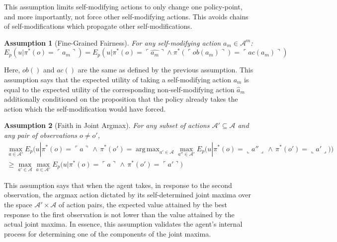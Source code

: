 \documentclass{article}
\newcommand{\qq}[1]{\ulcorner #1 \urcorner}
\newtheorem{assumption}{Assumption}
\DeclareMathOperator*{\argmax}{arg\,max}
\begin{document}
This assumption limits self-modifying actions to only change one policy-point, and more importantly, not force other self-modifying actions. This avoids chains of self-modifications which propagate other self-modifications. 

\begin{assumption}[Fine-Grained Fairness]
For any self-modifying action $a_m \in \mathcal{A}^m$:
$$ E_p(u|\pi^*(o)=\qq{a_m}) = E_p(u|\pi^*(o)=\qq{\hat {a_m}} \wedge \pi^*(\qq{ob(a_m)})=\qq{ac(a_m)}) $$
\end{assumption}

Here, $ob()$ and $ac()$ are the same as defined by the previous assumption. This assumption says that the expected utility of taking a self-modifying action $a_m$ is equal to the expected utility of the corresponding non-self-modifying action $\hat a_m$ additionally conditioned on the proposition that the policy already takes the action which the self-modification would have forced.

\begin{assumption}[Faith in Joint Argmax]
For any subset of actions $\mathcal{A}' \subseteq \mathcal{A}$ and any pair of observations $o \neq o'$,
\begin{multline*}
    \max_{a \in \mathcal{A}'} E_p \Big( u | \pi^*(o) = \qq{a}\,\land\,\pi^*(o') = \argmax_{a' \in \mathcal{A}} \max_{a'' \in \mathcal{A}'} E_p \big( u | \pi^*(o) = \llcorner a'' \lrcorner\,\land\,\pi^*(o') = \llcorner a' \lrcorner \big) \Big) \\
    \geq \max_{a' \in \mathcal{A}} \max_{a \in \mathcal{A}'} E_p \big( u | \pi^*(o) = \qq{a}\,\land\,\pi^*(o') = \qq{a'} \big)
\end{multline*}
\end{assumption}

This assumption says that when the agent takes, in response to the second observation, the argmax action dictated by its self-determined joint maxima over the space $\mathcal{A}' \times \mathcal{A}$ of action pairs, the expected value attained by the best response to the first observation is not lower than the value attained by the actual joint maxima. In essence, this assumption validates the agent's internal process for determining one of the components of the joint maxima. %
\end{document}
